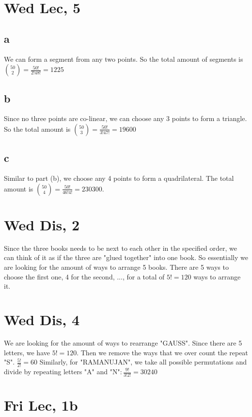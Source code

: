 \documentclass[12pt]{article}
\begin{document}
\section{Wed Lec, 5}

\subsection{a}
We can form a segment from any two points. So the total amount of segments is $\binom{50}{2} = \frac{50!}{2!48!}=1225$

\subsection{b}
Since no three points are co-linear, we can choose any 3 points to form a triangle. So the total amount is $\binom{50}{3} = \frac{50!}{3!47!} = 19600$

\subsection{c}
Similar to part (b), we choose any 4 points to form a quadrilateral. The total amount is $\binom {50} {4} = \frac{50!}{46!4!} = 230300$.

\newpage

\section{Wed Dis, 2}
Since the three books needs to be next to each other in the specified order, we can think of it as if the three are "glued together" into one book. So essentially we are looking for the amount of ways to arrange 5 books.
\newline
There are 5 ways to choose the first one, 4 for the second, ..., for a total of $5! = 120$ ways to arrange it.

\section{Wed Dis, 4}
We are looking for the amount of ways to rearrange "GAUSS". Since there are 5 letters, we have $5!=120$. Then we remove the ways that we over count the repeat "S". $\frac{5!}{2!} = 60$
\newline
Similarly, for "RAMANUJAN", we take all possible permutations and divide by repeating letters "A" and "N"$: \frac{9!}{3!2!} = 30240$

\newpage

\section{Fri Lec, 1b}
\end{document}
